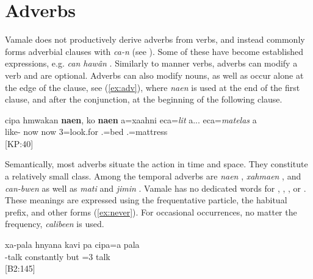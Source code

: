 \section{Adverbs}
\label{sec:Adv}

Vamale does not productively derive adverbs from verbs, and instead commonly forms adverbial clauses with \textit{ca-n}  (see ). Some of these have become established expressions, e.g. \textit{can hawân} .
Similarly to manner verbs, adverbs can modify a verb and are optional. Adverbs can also modify nouns, as well as occur alone at the edge of the clause, see (\ref{ex:adv}), where \textit{naen}  is used at the end of the first clause, and after the conjunction, at the beginning of the following clause. 

\ea \label{ex:adv}
\gll  cipa hmwakan \textbf{naen}, ko \textbf{naen} a=xaahni eca=\textit{lit} a... eca=\textit{matelas} a \\ 
  like- now  now 3=look.for .=bed  .=mattress \\ 
\glt {} {[KP:40]}
\z

Semantically, most adverbs situate the action in time and space. They constitute a relatively small class. Among the temporal adverbs are \textit{naen} , \textit{xahmaen} , and \textit{can-bwen}  as well as \textit{mati}  and \textit{jimin} . Vamale has no dedicated words for , , , or . These meanings are expressed using the frequentative particle, the habitual prefix, and other forms (\ref{ex:never}). For occasional occurrences, no matter the frequency, \textit{calibeen}  is used. 

\ea \label{ex:never}
\gll  xa-pala hnyana kavi pa cipa=a pala\\ 
 -talk constantly but  =3 talk\\ 
\glt {} {[B2:145]}
\z

